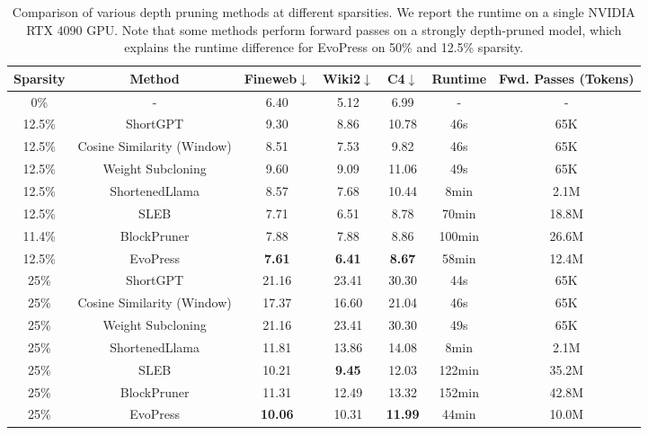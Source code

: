 

\begin{table}[ht]
\centering
\footnotesize
\caption{Comparison of various depth pruning methods at different sparsities. We report
the runtime on a single NVIDIA RTX 4090 GPU. Note that some methods perform forward passes on a strongly depth-pruned model, which explains the runtime difference for EvoPress on 50\% and 12.5\% sparsity.}
\label{tab:dropping_comparison}
\begin{tabular}{cc|ccc|cc}
\toprule
\textbf{Sparsity} & \textbf{Method} & \textbf{Fineweb$\downarrow$} & \textbf{Wiki2$\downarrow$} & \textbf{C4$\downarrow$} & \textbf{Runtime} & \textbf{Fwd. Passes (Tokens)} \\
\midrule
0\%   & -                                & 6.40  & 5.12  & 6.99  & -      & -      \\
\midrule
12.5\% & ShortGPT                         & 9.30  & 8.86  & 10.78 & 46s    & 65K    \\
12.5\% & Cosine Similarity (Window)          & 8.51  & 7.53  & 9.82  & 46s    & 65K    \\
12.5\% & Weight Subcloning               & 9.60  & 9.09  & 11.06 & 49s    & 65K    \\
12.5\% & ShortenedLlama                  & 8.57  & 7.68  & 10.44 & 8min   & 2.1M   \\
12.5\% & SLEB                             & 7.71  & 6.51  & 8.78  & 70min  & 18.8M  \\
11.4\% & BlockPruner                     & 7.88  & 7.88  & 8.86  & 100min & 26.6M  \\
12.5\% & EvoPress                         & \bf{7.61}  & \bf{6.41}  & \bf{8.67}  & 58min  & 12.4M  \\
\midrule
25\%   & ShortGPT                         & 21.16 & 23.41 & 30.30 & 44s    & 65K    \\
25\%   & Cosine Similarity (Window)          & 17.37 & 16.60 & 21.04 & 46s    & 65K    \\
25\%   & Weight Subcloning               & 21.16 & 23.41 & 30.30 & 49s    & 65K    \\
25\%   & ShortenedLlama                  & 11.81 & 13.86 & 14.08 & 8min   & 2.1M   \\
25\%   & SLEB                             & 10.21 & \bf{9.45}  & 12.03 & 122min & 35.2M  \\
25\%   & BlockPruner                     & 11.31 & 12.49 & 13.32 & 152min & 42.8M  \\
25\%   & EvoPress                         & \bf{10.06} & 10.31 & \bf{11.99} & 44min  & 10.0M  \\

\end{tabular}
\end{table}
